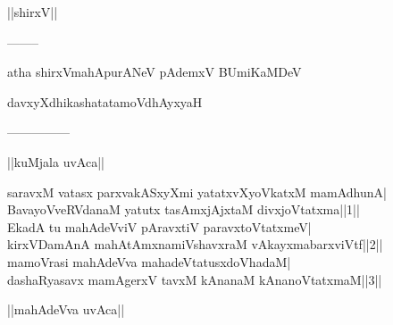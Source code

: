 \documentclass{article}
\begin{document}
\begin{center}
||shirxV||
\end{center}

\begin{center}
--------
\end{center}

\begin{center}
atha shirxVmahApurANeV pAdemxV BUmiKaMDeV
\end{center}

\begin{center}
davxyXdhikashatatamoVdhAyxyaH
\end{center}

\begin{center}
---------------
\end{center}

\begin{center}
||kuMjala uvAca||
\end{center}

saravxM vatasx parxvakASxyXmi yatatxvXyoVkatxM mamAdhunA|\\
BavayoVveRVdanaM yatutx tasAmxjAjxtaM divxjoVtatxma||1||\\
EkadA tu mahAdeVviV pAravxtiV paravxtoVtatxmeV|\\
kirxVDamAnA mahAtAmxnamiVshavxraM vAkayxmabarxviVtf||2||\\
mamoVrasi mahAdeVva mahadeVtatusxdoVhadaM|\\
dashaRyasavx mamAgerxV tavxM kAnanaM kAnanoVtatxmaM||3||\\

\begin{center}
||mahAdeVva uvAca||
\end{center}
\end{document}
